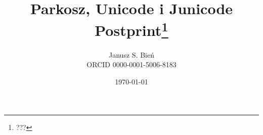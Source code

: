 \documentclass[withmarginpar]{mwart}
\newcommand{\uname}[1]{\texttt{'#1'}}
\newcommand{\ucode}[1]{\texttt{U+#1}}
\newcommand{\aname}[1]{\texttt{#1}}
\newcommand{\acode}[1]{\texttt{#1}}
\newcommand{\mname}[1]{\texttt{'#1 \textsc{<mufi>'}}}
\newcommand{\mcode}[1]{\texttt{M+#1}}
\begin{document}
\gappto\captionspolish{\renewcommand{\figurename}{Ilustracja}}



\title{Parkosz, Unicode i Junicode\\Postprint\footnote{???}}

\author{Janusz S. Bień\\ORCID 0000-0001-5006-8183}

\date{\today}

\maketitle




\end{document}
